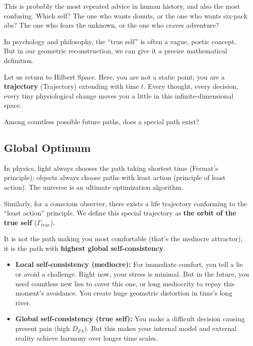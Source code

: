 \documentclass[11pt,a4paper,twoside]{book}
\begin{document}
This is probably the most repeated advice in human history, and also the most confusing. Which self? The one who wants donuts, or the one who wants six-pack abs? The one who fears the unknown, or the one who craves adventure?

In psychology and philosophy, the ``true self'' is often a vague, poetic concept. But in our geometric reconstruction, we can give it a precise mathematical definition.

Let us return to Hilbert Space. Here, you are not a static point; you are a \textbf{trajectory} (Trajectory) extending with time $t$. Every thought, every decision, every tiny physiological change moves you a little in this infinite-dimensional space.

Among countless possible future paths, does a special path exist?

\subsection{Global Optimum}

In physics, light always chooses the path taking shortest time (Fermat's principle); objects always choose paths with least action (principle of least action). The universe is an ultimate optimization algorithm.

Similarly, for a conscious observer, there exists a life trajectory conforming to the ``least action'' principle. We define this special trajectory as \textbf{the orbit of the true self} ($\Gamma_{true}$).

It is not the path making you most comfortable (that's the mediocre attractor); it is the path with \textbf{highest global self-consistency}.

\begin{itemize}
\item \textbf{Local self-consistency (mediocre):} For immediate comfort, you tell a lie or avoid a challenge. Right now, your stress is minimal. But in the future, you need countless new lies to cover this one, or long mediocrity to repay this moment's avoidance. You create huge geometric distortion in time's long river.

\item \textbf{Global self-consistency (true self):} You make a difficult decision causing present pain (high $D_{FS}$). But this makes your internal model and external reality achieve harmony over longer time scales.
\end{itemize}
\end{document}
